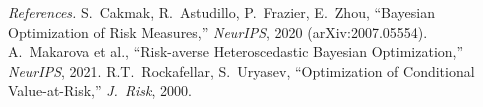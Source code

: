 \medskip
\noindent\emph{References.}\;
S.~Cakmak, R.~Astudillo, P.~Frazier, E.~Zhou, ``Bayesian Optimization of Risk Measures,''
\emph{NeurIPS}, 2020 (arXiv:2007.05554).\;
A.~Makarova et al., ``Risk-averse Heteroscedastic Bayesian Optimization,'' \emph{NeurIPS}, 2021.\;
R.T.~Rockafellar, S.~Uryasev, ``Optimization of Conditional Value-at-Risk,'' \emph{J.\ Risk}, 2000.
